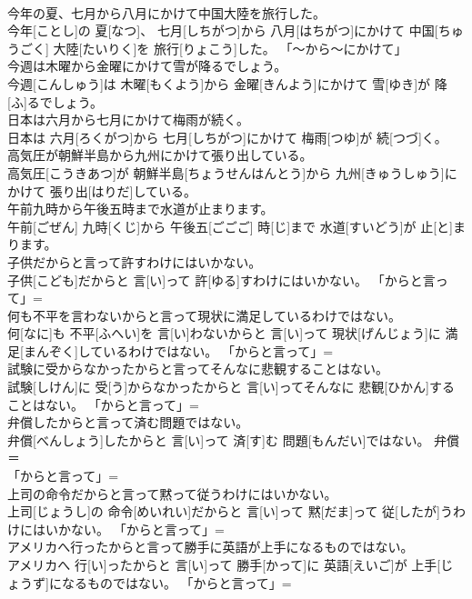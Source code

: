 \documentclass[8pt]{extreport}
\begin{document}
\begin{CJK}{UTF8}{min}
\\	今年の夏、七月から八月にかけて中国大陸を旅行した。	
\\	今年[ことし]の 夏[なつ]、 七月[しちがつ]から 八月[はちがつ]にかけて 中国[ちゅうごく] 大陸[たいりく]を 旅行[りょこう]した。	「〜から〜にかけて」 
\\	今週は木曜から金曜にかけて雪が降るでしょう。	
\\	今週[こんしゅう]は 木曜[もくよう]から 金曜[きんよう]にかけて 雪[ゆき]が 降[ふ]るでしょう。	
\\	日本は六月から七月にかけて梅雨が続く。	
\\	日本は 六月[ろくがつ]から 七月[しちがつ]にかけて 梅雨[つゆ]が 続[つづ]く。	
\\	高気圧が朝鮮半島から九州にかけて張り出している。	
\\	高気圧[こうきあつ]が 朝鮮半島[ちょうせんはんとう]から 九州[きゅうしゅう]にかけて 張り出[はりだ]している。	
\\	午前九時から午後五時まで水道が止まります。	
\\	午前[ごぜん] 九時[くじ]から 午後五[ごごご] 時[じ]まで 水道[すいどう]が 止[と]まります。	
\\	子供だからと言って許すわけにはいかない。	
\\	子供[こども]だからと 言[い]って 許[ゆる]すわけにはいかない。	「からと言って」= 
\\	何も不平を言わないからと言って現状に満足しているわけではない。	
\\	何[なに]も 不平[ふへい]を 言[い]わないからと 言[い]って 現状[げんじょう]に 満足[まんぞく]しているわけではない。	「からと言って」= 
\\	試験に受からなかったからと言ってそんなに悲観することはない。	
\\	試験[しけん]に 受[う]からなかったからと 言[い]ってそんなに 悲観[ひかん]することはない。	「からと言って」= 
\\	弁償したからと言って済む問題ではない。	
\\	弁償[べんしょう]したからと 言[い]って 済[す]む 問題[もんだい]ではない。	弁償＝
\\	「からと言って」= 
\\	上司の命令だからと言って黙って従うわけにはいかない。	
\\	上司[じょうし]の 命令[めいれい]だからと 言[い]って 黙[だま]って 従[したが]うわけにはいかない。	「からと言って」= 
\\	アメリカへ行ったからと言って勝手に英語が上手になるものではない。	
\\	アメリカへ 行[い]ったからと 言[い]って 勝手[かって]に 英語[えいご]が 上手[じょうず]になるものではない。	「からと言って」= 

\end{CJK}
\end{document}
